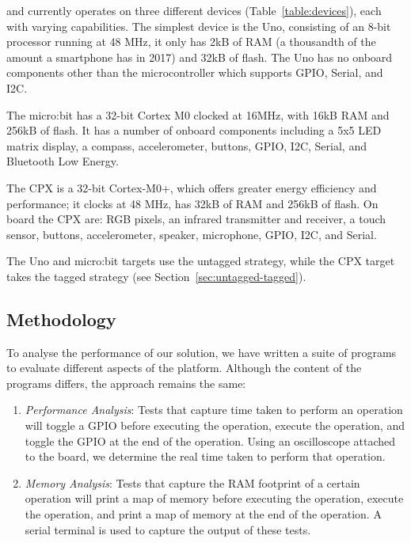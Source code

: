\MC and \CO currently operates on three different devices (Table~\ref{table:devices}), each with varying capabilities. The simplest device is the Uno, consisting of an 8-bit processor running at 48 MHz, it only has 2kB of RAM (a thousandth of the amount a smartphone has in 2017) and 32kB of flash. The Uno has no onboard components other than the microcontroller which supports GPIO, Serial, and I2C.

The micro:bit has a 32-bit Cortex M0 clocked at 16MHz, with 16kB RAM and 256kB of flash. It has a number of onboard components including a 5x5 LED matrix display, a compass, accelerometer, buttons, GPIO, I2C, Serial, and Bluetooth Low Energy.

The CPX is a 32-bit Cortex-M0+, which offers greater energy efficiency and performance; it clocks at 48 MHz, has 32kB of RAM and 256kB of flash. On board the CPX are: RGB pixels, an infrared transmitter and receiver, a touch sensor, buttons, accelerometer, speaker, microphone, GPIO, I2C, and Serial.

The Uno and micro:bit \MC targets use the untagged strategy, while the CPX target takes the tagged strategy (see Section~\ref{sec:untagged-tagged}).

\subsection{Methodology}

To analyse the performance of our solution, we have written a suite of programs to evaluate different aspects of the platform. Although the content of the programs differs, the approach remains the same:

\begin{enumerate}
    \item \textit{Performance Analysis}: Tests that capture time taken to perform an operation will toggle a GPIO before executing the operation, execute the operation, and toggle the GPIO at the end of the operation. Using an oscilloscope attached to the board, we determine the real time taken to perform that operation.

    \item \textit{Memory Analysis}: Tests that capture the RAM footprint of a certain operation will print a map of memory before executing the operation, execute the operation, and print a map of memory at the end of the operation. A serial terminal is used to capture the output of these tests.
\end{enumerate}

